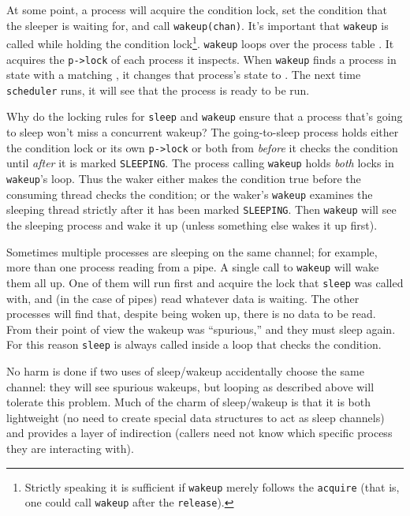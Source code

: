 At some point, a process will acquire the condition lock,
set the condition that the sleeper is waiting for,
and call \lstinline{wakeup(chan)}.
It's important that \lstinline{wakeup} is called
while holding the condition lock\footnote{%
%
Strictly speaking it is sufficient if
\lstinline{wakeup}
merely follows the
\lstinline{acquire}
(that is, one could call
\lstinline{wakeup}
after the
\lstinline{release}).%
%
}.
\lstinline{wakeup}
loops over the process table
.
It acquires the
\lstinline{p->lock}
of each process it inspects.
When \lstinline{wakeup} finds a process in state
with a matching
,
it changes that process's state to
.
The next time \lstinline{scheduler} runs, it will
see that the process is ready to be run.

Why do the locking rules for 
\lstinline{sleep}
and
\lstinline{wakeup}
ensure that a process that's going to sleep
won't miss a concurrent wakeup?
The going-to-sleep process holds either
the condition lock or its own
\lstinline{p->lock} 
or both from {\it before} it checks the condition
until {\it after} it is marked \texttt{SLEEPING}.
The process calling \texttt{wakeup} holds \textit{both}
locks in \texttt{wakeup}'s loop.
Thus the waker either makes the condition true before
the consuming thread checks the condition;
or the waker's \lstinline{wakeup} examines the sleeping
thread strictly after it has been marked \texttt{SLEEPING}.
Then 
\lstinline{wakeup}
will see the sleeping process and wake it up
(unless something else wakes it up first).

Sometimes multiple processes are sleeping
on the same channel; for example, more than one process
reading from a pipe.
A single call to 
\lstinline{wakeup}
will wake them all up.
One of them will run first and acquire the lock that
\lstinline{sleep}
was called with, and (in the case of pipes) read whatever
data is waiting.
The other processes will find that, despite being woken up,
there is no data to be read.
From their point of view the wakeup was ``spurious,'' and
they must sleep again.
For this reason \lstinline{sleep} is always called inside a loop that
checks the condition.

No harm is done if two uses of sleep/wakeup accidentally
choose the same channel: they will see spurious wakeups,
but looping as described above will tolerate this problem.
Much of the charm of sleep/wakeup is that it is both
lightweight (no need to create special data
structures to act as sleep channels) and provides a layer
of indirection (callers need not know which specific process
they are interacting with).
